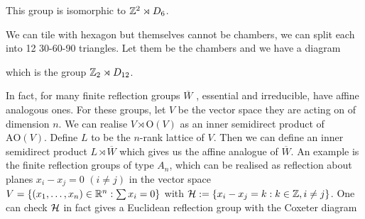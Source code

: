 \documentclass[../main.tex]{subfiles}
\begin{document}
This group is isomorphic to $\mathbb{Z}^2 \rtimes D_6$.

We can tile with hexagon but themselves cannot be chambers, we can split each into 12 30-60-90 triangles. Let them be the chambers and we have a diagram 


which is the group $\mathbb{Z}_2 \rtimes D_{12}$.

In fact, for many finite reflection groups $\overline W$ , essential and irreducible, have affine analogous ones. For these groups, let $V$ be the vector space they are acting on of dimension $n$. We can realise $V\rtimes\text{O}(V)$ as an inner semidirect product of $\text{AO}(V)$. Define $L$ to be the $n$-rank lattice of $V$. Then we can define an inner semidirect product $L\rtimes \overline W$ which gives us the affine analogue of $\overline W$. An example is the finite reflection groups of type $A_n$, which can be realised as reflection about planes $x_i-x_j=0$ $(i\neq j)$ in the vector space $V=\{(x_1,\dots,x_n)\in\mathbb{R}^n:\sum x_i=0\}$ with $\mathcal{H} := \{x_i-x_j=k:k\in \mathbb{Z}, i\neq j\}$. One can check $\mathcal{H}$ in fact gives a Euclidean reflection group with the Coxeter diagram
\end{document}
